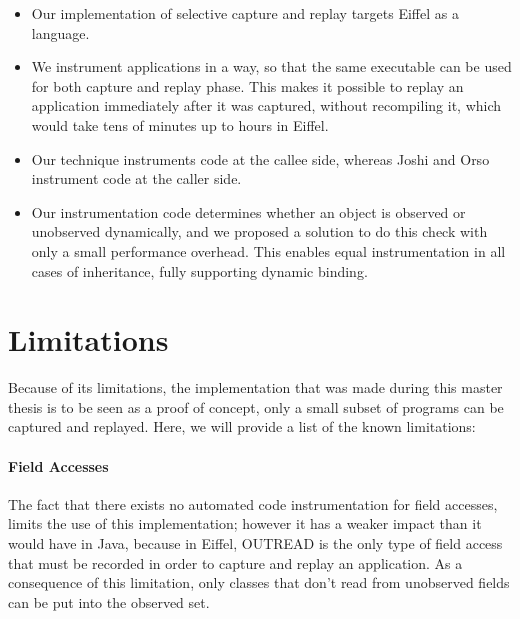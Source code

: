 \begin{itemize}
\item Our implementation of selective capture and replay targets Eiffel as a language.
\item We instrument applications in a way, so that the same executable can be used for both capture and replay phase. This makes it possible to replay an application immediately after it was captured, without recompiling it, which would take tens of minutes up to hours in Eiffel.
\item Our technique instruments code at the callee side, whereas Joshi and Orso instrument code at the caller side. 
\item Our instrumentation code determines whether an object is observed or unobserved dynamically, and we proposed a solution to do this check with only a small performance overhead. This enables equal instrumentation in all cases of inheritance, fully supporting dynamic binding. 
\end {itemize}

\section {Limitations}
Because of its limitations, the implementation that was made during this master thesis is to be seen as a proof of concept, only a small subset of programs can be captured and replayed. Here, we will provide a list of the known limitations:

\paragraph{Field Accesses}
The fact that there exists no automated code instrumentation for field accesses, limits the use of this implementation; however it has a weaker impact than it would have in Java, because in Eiffel, OUTREAD is the only type of field access that must be recorded in order to capture and replay an application. As a consequence of this limitation, only classes that don't read from unobserved fields can be put into the observed set.

